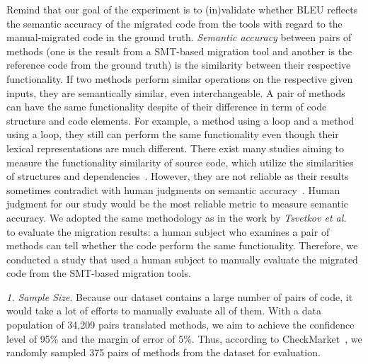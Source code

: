 Remind that our goal of the experiment is to (in)validate whether BLEU
reflects the semantic accuracy of the migrated code from the tools
with regard to the manual-migrated code in the ground truth. {\em
  Semantic accuracy} between pairs of methods (one is the result from
a SMT-based migration tool and another is the reference code from the
ground truth) is the similarity between their respective
functionality. If two methods perform similar operations on the
respective given inputs, they are semantically similar, even
interchangeable. A pair of methods can have the same functionality
despite of their difference in term of code structure and code
elements.
%
For example, a method using a  loop and a method using a
 loop, they still can perform the same functionality even
though their lexical representations are much different. There exist
many studies aiming to measure the functionality similarity of source
code, which utilize the similarities of structures and
dependencies~\cite{clone-tse07,roy09,baker97,ccfinder,cpminer,deckard,deckard2,horwitz01}.
However, they are not reliable as their results sometimes contradict
with human judgments on semantic accuracy~\cite{deckard2}. 
%
Human judgment for our study would be the most reliable metric to
measure semantic accuracy. We adopted the same methodology as in the
work by {\em Tsvetkov et al.}~\cite{tsvetkov-acl15} to evaluate the
migration results:
%
a human subject who examines a pair of methods can tell whether the
code perform the same functionality.
%
Therefore, we conducted a study that used a human subject to manually
evaluate the migrated code from the SMT-based migration tools.


\emph{1. Sample Size}. Because our dataset contains a large number of
pairs of code, it would take a lot of efforts to manually evaluate all
of them. With a data population of 34,209 pairs translated methods, we
aim to achieve the confidence level of 95\% and the margin of error of
5\%. Thus, according to CheckMarket~\cite{sample}, we randomly sampled
375 pairs of methods from the dataset for evaluation.


